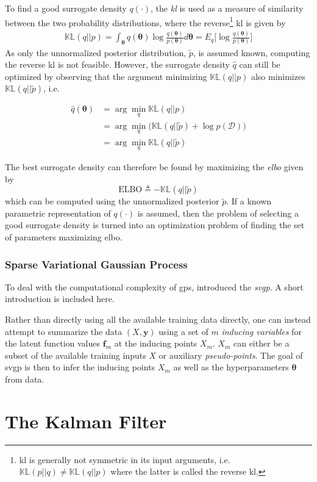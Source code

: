 To find a good surrogate density $q(\cdot)$, the \textit{\acrfull{kl}} is used as a measure of similarity between the two probability distributions, where the reverse\footnote{\acrshort{kl} is generally not symmetric in its input arguments, i.e. $\mathbb{KL}(p || q) \neq \mathbb{KL}(q || p)$ where the latter is called the reverse \acrshort{kl}.} \acrshort{kl} is given by
\begin{align}
    \mathbb{KL}(q || p) = \int_{\boldsymbol{\theta}} q(\boldsymbol{\theta}) \log \frac{q(\boldsymbol{\theta})}{p(\boldsymbol{\theta})} d\boldsymbol{\theta} = E_{q} \big[ \log \frac{q(\boldsymbol{\theta})}{p(\boldsymbol{\theta})} \big]\label{eq:kl_qp}
\end{align}
As only the unnormalized posterior distribution, $\tilde{p}$, is assumed known, computing the reverse \acrshort{kl} is not feasible. However, the surrogate density $\hat{q}$ can still be optimized by observing that the argument minimizing $\mathbb{KL}(q || p)$ also minimizes $\mathbb{KL}(q || \tilde{p})$, i.e.

\begin{align}
    \hat{q}(\boldsymbol{\theta}) &= \arg \min_q \mathbb{KL}(q || p)\\ &= \arg \min_q \big(\mathbb{KL}(q || \tilde{p}) + \log p(\mathcal{D})\big) \\&= \arg \min_q \mathbb{KL} (q || \tilde{p})
\end{align}

The best surrogate density can therefore be found by maximizing the \textit{\acrfull{elbo}} given by 
\begin{equation}
    \text{ELBO} \triangleq -\mathbb{KL}(q || \tilde{p})
\end{equation} which can be computed using the unnormalized posterior $\tilde{p}$. If a known parametric representation of $q(\cdot)$ is assumed, then the problem of selecting a good surrogate density is turned into an optimization problem of finding the set of parameters maximizing \acrshort{elbo}. 

\subsubsection{Sparse Variational Gaussian Process}
To deal with the computational complexity of \acrshort{gp}s, \cite{Titsias2008VariationalMS} introduced the \textit{\acrfull{svgp}}. A short introduction is included here. 

Rather than directly using all the available training data directly, one can instead attempt to summarize the data $(X, \boldsymbol{y})$ using a set of $m$ \textit{inducing variables} for the latent function values $\boldsymbol{f}_m$ at the inducing points $X_m$. $X_m$ can either be a subset of the available training inputs $X$ or auxiliary \textit{pseudo-points}. The goal of \acrshort{svgp} is then to infer the inducing points $X_m$ as well as the hyperparameters $\boldsymbol{\theta}$ from data.


\section{The Kalman Filter}

